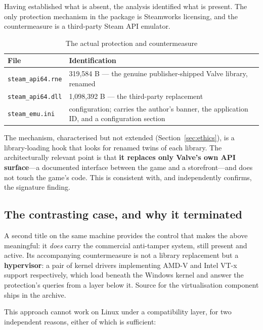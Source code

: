 Having established what is absent, the analysis identified what is present. The
only protection mechanism in the package is Steamworks licensing, and the
countermeasure is a third-party Steam API emulator.

\begin{table}[htbp]
\caption{The actual protection and countermeasure}
\label{tab:rune}
\centering
\footnotesize
\begin{tabularx}{\columnwidth}{@{}L{3.0cm}X@{}}
\toprule
\textbf{File} & \textbf{Identification} \\
\midrule
\verb|steam_api64.rne| & 319{,}584 B --- the genuine publisher-shipped Valve
                         library, renamed \\
\verb|steam_api64.dll| & 1{,}098{,}392 B --- the third-party replacement \\
\verb|steam_emu.ini| & configuration; carries the author's banner, the
                       application ID, and a configuration section \\
\bottomrule
\end{tabularx}
\end{table}

The mechanism, characterised but not extended (Section~\ref{sec:ethics}), is a
library-loading hook that looks for renamed twins of each library. The
architecturally relevant point is that \textbf{it replaces only Valve's own API
surface}---a documented interface between the game and a storefront---and does
not touch the game's code. This is consistent with, and independently confirms,
the signature finding.

\subsection{The contrasting case, and why it terminated}
\label{sec:contrast}

A second title on the same machine provides the control that makes the above
meaningful: it \emph{does} carry the commercial anti-tamper system, still present
and active. Its accompanying countermeasure is not a library replacement but a
\textbf{hypervisor}: a pair of kernel drivers implementing AMD-V and Intel VT-x
support respectively, which load beneath the Windows kernel and answer the
protection's queries from a layer below it. Source for the virtualisation
component ships in the archive.

This approach cannot work on Linux under a compatibility layer, for two
independent reasons, either of which is sufficient:


